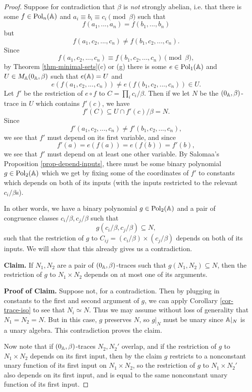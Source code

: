 \begin{appendices}
\begin{proof}
Suppose for contradiction that $\beta$ is \emph{not} strongly abelian, i.e. that there is some $f \in \operatorname{Pol}_n(\mathbb{A})$ and $a_i \equiv b_i \equiv c_i \pmod{\beta}$ such that
\[
f(a_1, ..., a_n) = f(b_1, ..., b_n)
\]
but
\[
f(a_1, c_2, ..., c_n) \ne f(b_1, c_2, ..., c_n).
\]
Since
\[
f(a_1, c_2, ..., c_n) \equiv f(b_1, c_2, ..., c_n) \pmod{\beta},
\]
by Theorem \ref{thm-minimal-sets}(c) or (g) there is some $e \in \operatorname{Pol}_1(\mathbb{A})$ and $U \in M_{\mathbb{A}}(0_{\mathbb{A}}, \beta)$ such that $e(\mathbb{A}) = U$ and
\[
e(f(a_1, c_2, ..., c_n)) \ne e(f(b_1, c_2, ..., c_n)) \in U.
\]
Let $f'$ be the restriction of $e \circ f$ to $C = \prod_i c_i/\beta$. Then if we let $N$ be the $(0_{\mathbb{A}}, \beta)$-trace in $U$ which contains $f'(c)$, we have
\[
f'(C) \subseteq U \cap f'(c)/\beta = N.
\]
Since
\[
f'(a_1, c_2, ..., c_n) \ne f'(b_1, c_2, ..., c_n),
\]
we see that $f'$ must depend on its first variable, and since
\[
f'(a) = e(f(a)) = e(f(b)) = f'(b),
\]
we see that $f'$ must depend on at least one other variable. By Salomaa's Proposition \ref{prop-depend-inputs}, there must be some binary polynomial $g \in \operatorname{Pol}_2(\mathbb{A})$ which we get by fixing some of the coordinates of $f'$ to constants which depends on both of its inputs (with the inputs restricted to the relevant $c_i/\beta$s).

In other words, we have a binary polynomial $g \in \operatorname{Pol}_2(\mathbb{A})$ and a pair of congruence classes $c_i/\beta, c_j/\beta$ such that
\[
g(c_i/\beta, c_j/\beta) \subseteq N,
\]
such that the restriction of $g$ to $C_{ij} = (c_i/\beta) \times (c_j/\beta)$ depends on both of its inputs. We will show that this already gives us a contradiction.

{\bf Claim.} If $N_1, N_2$ are a pair of $(0_{\mathbb{A}}, \beta)$-traces such that $g(N_1, N_2) \subseteq N$, then the restriction of $g$ to $N_1 \times N_2$ depends on at most one of its arguments.

{\bf Proof of Claim.} Suppose not, for a contradiction. Then by plugging in constants to the first and second argument of $g$, we can apply Corollary \ref{cor-trace-iso} to see that $N_i \simeq N$. Thus we may assume without loss of generality that $N_1 = N_2 = N$. But in this case, $g$ preserves $N$, so $g|_N$ must be unary since $\mathbb{A}|_N$ is a unary algebra. This contradiction proves the claim.

Now note that if $(0_{\mathbb{A}},\beta)$-traces $N_2, N_2'$ overlap, and if the restriction of $g$ to $N_1 \times N_2$ depends on its first input, then by the claim $g$ restricts to a nonconstant unary function of its first input on $N_1 \times N_2$, so the restriction of $g$ to $N_1 \times N_2'$ also depends on its first input, and is equal to the same nonconstant unary function of its first input.


\end{proof}
\end{appendices}
